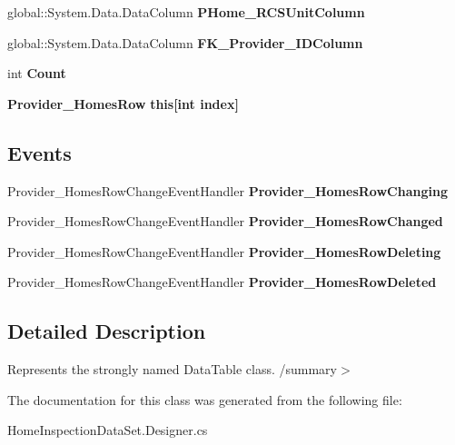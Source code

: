 \begin{DoxyCompactItemize}
\item 
\mbox{\label{class_a_f_h___scheduler_1_1_home_inspection_data_set_1_1_provider___homes_data_table_ad3d3d559791bf1640e659d7aff761082}} 
global\+::\+System.\+Data.\+Data\+Column {\bfseries P\+Home\+\_\+\+R\+C\+S\+Unit\+Column}\hspace{0.3cm}{\ttfamily  [get]}
\item 
\mbox{\label{class_a_f_h___scheduler_1_1_home_inspection_data_set_1_1_provider___homes_data_table_a0cbb72efcd0b9879c687a5977ee1807a}} 
global\+::\+System.\+Data.\+Data\+Column {\bfseries F\+K\+\_\+\+Provider\+\_\+\+I\+D\+Column}\hspace{0.3cm}{\ttfamily  [get]}
\item 
\mbox{\label{class_a_f_h___scheduler_1_1_home_inspection_data_set_1_1_provider___homes_data_table_aab64d75819fcb57bbe2bd4f87f2dfef6}} 
int {\bfseries Count}\hspace{0.3cm}{\ttfamily  [get]}
\item 
\mbox{\label{class_a_f_h___scheduler_1_1_home_inspection_data_set_1_1_provider___homes_data_table_a74c4c01f7c8e99aa6da943e5d611bd15}} 
\textbf{ Provider\+\_\+\+Homes\+Row} {\bfseries this[int index]}\hspace{0.3cm}{\ttfamily  [get]}
\end{DoxyCompactItemize}
\subsection*{Events}
\begin{DoxyCompactItemize}
\item 
\mbox{\label{class_a_f_h___scheduler_1_1_home_inspection_data_set_1_1_provider___homes_data_table_a731c61a10f2df45e1daaeb5d62df98f7}} 
Provider\+\_\+\+Homes\+Row\+Change\+Event\+Handler {\bfseries Provider\+\_\+\+Homes\+Row\+Changing}
\item 
\mbox{\label{class_a_f_h___scheduler_1_1_home_inspection_data_set_1_1_provider___homes_data_table_a964822bd88709550b8106eea3d87f46a}} 
Provider\+\_\+\+Homes\+Row\+Change\+Event\+Handler {\bfseries Provider\+\_\+\+Homes\+Row\+Changed}
\item 
\mbox{\label{class_a_f_h___scheduler_1_1_home_inspection_data_set_1_1_provider___homes_data_table_a892075be1d06105c4c077b4e0fd8f773}} 
Provider\+\_\+\+Homes\+Row\+Change\+Event\+Handler {\bfseries Provider\+\_\+\+Homes\+Row\+Deleting}
\item 
\mbox{\label{class_a_f_h___scheduler_1_1_home_inspection_data_set_1_1_provider___homes_data_table_a9fd3425b33751a18af854469c4213a8f}} 
Provider\+\_\+\+Homes\+Row\+Change\+Event\+Handler {\bfseries Provider\+\_\+\+Homes\+Row\+Deleted}
\end{DoxyCompactItemize}


\subsection{Detailed Description}
Represents the strongly named Data\+Table class. /summary$>$ 

The documentation for this class was generated from the following file\+:\begin{DoxyCompactItemize}
\item 
Home\+Inspection\+Data\+Set.\+Designer.\+cs\end{DoxyCompactItemize}
